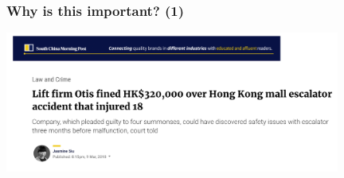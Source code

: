 
\begin{frame}
\frametitle{Why is this important? (1)}
\includegraphics[width=11cm]{imagesfieldservice/southchina}
\end{frame}

